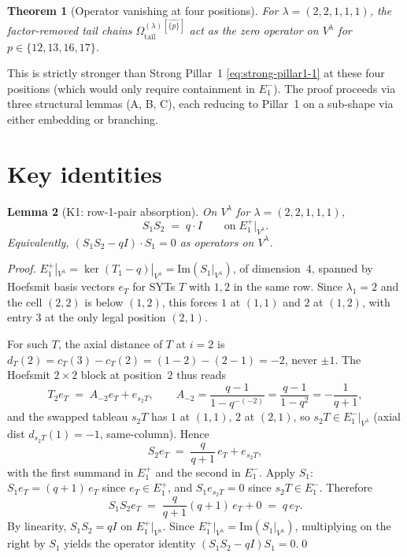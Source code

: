 \documentclass[11pt]{article}
\newtheorem{theorem}{Theorem}
\newtheorem{lemma}[theorem]{Lemma}
\theoremstyle{definition}
\newcommand{\Vlam}{V^\lambda}
\newcommand{\Omtail}{\Omega^{(\lambda)}_{\mathrm{tail}}}
\newcommand{\Eplus}[1]{E^+_{#1}}
\newcommand{\Eminus}[1]{E^-_{#1}}
\begin{document}
\begin{theorem}[Operator vanishing at four positions]\label{thm:main}
For $\lambda = (2,2,1,1,1)$, the factor-removed tail chains
$\Omtail^{[\widehat{\{p\}}]}$ act as the zero operator on $\Vlam$ for
$p \in \{12, 13, 16, 17\}$.
\end{theorem}

\noindent
This is strictly stronger than Strong Pillar~1 \eqref{eq:strong-pillar1-1} at
these four positions (which would only require containment in $\Eminus 1$).
The proof proceeds via three structural lemmas (A, B, C), each reducing to
Pillar~1 on a sub-shape via either embedding or branching.

\section{Key identities}

\begin{lemma}[K1: row-1-pair absorption]\label{lem:K1}
On $\Vlam$ for $\lambda = (2,2,1,1,1)$,
\[
   S_1 S_2 \;=\; q \cdot I \qquad \text{on}\; \Eplus 1|_{\Vlam}.
\]
Equivalently, $(S_1 S_2 - q I) \cdot S_1 = 0$ as operators on $\Vlam$.
\end{lemma}

\begin{proof}
$\Eplus 1|_{\Vlam} = \ker(T_1 - q)|_{\Vlam} = \mathrm{Im}(S_1|_{\Vlam})$, of dimension~$4$,
spanned by Hoefsmit basis vectors $e_T$ for SYTs $T$ with $1, 2$ in the same row.
Since $\lambda_1 = 2$ and the cell $(2,2)$ is below $(1,2)$, this forces $1$ at
$(1,1)$ and $2$ at $(1,2)$, with entry $3$ at the only legal position $(2,1)$.

For such $T$, the axial distance of $T$ at $i=2$ is
$d_T(2) = c_T(3) - c_T(2) = (1 - 2) - (2 - 1) = -2$, never $\pm 1$. The Hoefsmit
$2 \times 2$ block at position~$2$ thus reads
\[
   T_2 e_T \;=\; A_{-2} e_T + e_{s_2 T},
   \qquad A_{-2} = \frac{q-1}{1 - q^{-(-2)}} = \frac{q-1}{1-q^2} = -\frac{1}{q+1},
\]
and the swapped tableau $s_2 T$ has $1$ at $(1,1)$, $2$ at $(2,1)$, so
$s_2 T \in \Eminus 1|_{\Vlam}$ (axial dist $d_{s_2 T}(1) = -1$, same-column).
Hence
\[
   S_2 e_T \;=\; \frac{q}{q+1}\, e_T + e_{s_2 T},
\]
with the first summand in $\Eplus 1$ and the second in $\Eminus 1$. Apply $S_1$:
$S_1 e_T = (q+1)\,e_T$ since $e_T \in \Eplus 1$, and $S_1 e_{s_2 T} = 0$ since
$s_2 T \in \Eminus 1$. Therefore
\[
   S_1 S_2 e_T \;=\; \frac{q}{q+1} (q+1)\, e_T + 0 \;=\; q\, e_T.
\]
By linearity, $S_1 S_2 = q I$ on $\Eplus 1|_{\Vlam}$. Since
$\Eplus 1|_{\Vlam} = \mathrm{Im}(S_1|_{\Vlam})$, multiplying on the right by $S_1$
yields the operator identity $(S_1 S_2 - qI) S_1 = 0$.\qed
\end{proof}
\end{document}
